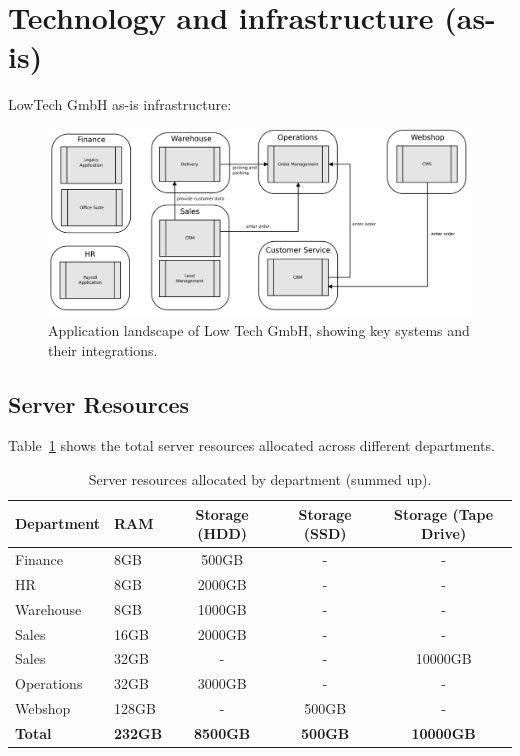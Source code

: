 \section{Technology and infrastructure (as-is)}
\label{sec:as-is}

LowTech GmbH as-is infrastructure:
\begin{figure}[H]
\centering
\includegraphics[width=1\textwidth]{Images/LowTech} 
\caption{Application landscape of Low Tech GmbH, showing key systems and their integrations.}
\label{fig:vite}
\end{figure}

\subsection{Server Resources}
\label{sec:server_res}

Table~\ref{tab:resources} shows the total server resources allocated across different departments.

\begin{table}[h!]
\centering
\begin{tabular}{llccc}
\toprule
\textbf{Department} & \textbf{RAM} & \textbf{Storage (HDD)} & \textbf{Storage (SSD)} & \textbf{Storage (Tape Drive)} \\
\midrule
Finance   & 8GB   & 500GB  & -    & -      \\
HR        & 8GB   & 2000GB & -    & -      \\
Warehouse & 8GB   & 1000GB & -    & -      \\
Sales     & 16GB  & 2000GB & -    & -      \\
Sales     & 32GB  & -      & -    & 10000GB \\
Operations & 32GB & 3000GB & -    & -      \\
Webshop   & 128GB & -      & 500GB & -      \\
\midrule
\textbf{Total}       & \textbf{232GB} & \textbf{8500GB} & \textbf{500GB} & \textbf{10000GB} \\
\bottomrule
\end{tabular}
\caption{Server resources allocated by department (summed up).}
\label{tab:resources}
\end{table}

